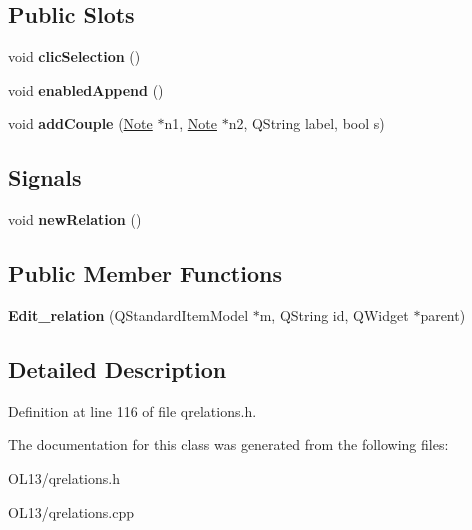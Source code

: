 \subsection*{Public Slots}
\begin{DoxyCompactItemize}
\item 
\mbox{\label{class_edit__relation_ab8b401c68bf851bea39fc38fbce0f9f5}} 
void {\bfseries clic\+Selection} ()
\item 
\mbox{\label{class_edit__relation_a558f8134fbd20281e24ceb350882ddaf}} 
void {\bfseries enabled\+Append} ()
\item 
\mbox{\label{class_edit__relation_a06254b8a5265ba82160c6ab62bbf9101}} 
void {\bfseries add\+Couple} (\hyperlink{class_note}{Note} $\ast$n1, \hyperlink{class_note}{Note} $\ast$n2, Q\+String label, bool s)
\end{DoxyCompactItemize}
\subsection*{Signals}
\begin{DoxyCompactItemize}
\item 
\mbox{\label{class_edit__relation_a39ece696a8813495b806fcd5cc8ec51c}} 
void {\bfseries new\+Relation} ()
\end{DoxyCompactItemize}
\subsection*{Public Member Functions}
\begin{DoxyCompactItemize}
\item 
\mbox{\label{class_edit__relation_aea8577d292461d142c4087fd5446a48c}} 
{\bfseries Edit\+\_\+relation} (Q\+Standard\+Item\+Model $\ast$m, Q\+String id, Q\+Widget $\ast$parent)
\end{DoxyCompactItemize}


\subsection{Detailed Description}


Definition at line 116 of file qrelations.\+h.



The documentation for this class was generated from the following files\+:\begin{DoxyCompactItemize}
\item 
O\+L13/qrelations.\+h\item 
O\+L13/qrelations.\+cpp\end{DoxyCompactItemize}
